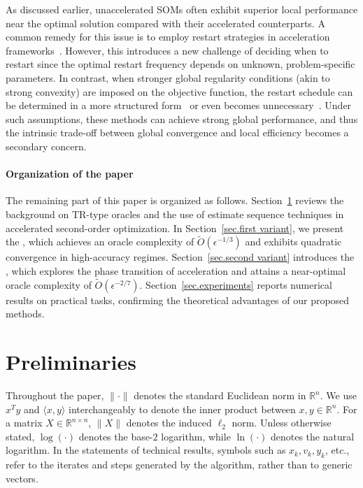 \documentclass{article}
\numberwithin{equation}{section}
\numberwithin{equation}{section}
\begin{document}
As discussed earlier, unaccelerated SOMs often exhibit superior local performance near the optimal solution compared with their accelerated counterparts. A common remedy for this issue is to employ restart strategies in acceleration frameworks~\cite{nesterov2018lectures}. However, this introduces a new challenge of deciding when to restart since the optimal restart frequency depends on unknown, problem-specific parameters. In contrast, when stronger global regularity conditions (akin to strong convexity) are imposed on the objective function, the restart schedule can be determined in a more structured form~\cite{ostroukhov2020tensor, lin2025perseus, huang2025approximation} or even becomes unnecessary~\cite{jiang2022generalized, marquesalves2022variants}. Under such assumptions, these methods can achieve strong global performance, and thus the intrinsic trade-off between global convergence and local efficiency becomes a secondary concern.

\paragraph{Organization of the paper}
The remaining part of this paper is organized as follows. Section~\ref{sec.priliminary} reviews the background on TR-type oracles and the use of estimate sequence techniques in accelerated second-order optimization. In Section~\ref{sec.first variant}, we present the , which achieves an oracle complexity of $\tilde O(\epsilon^{-1/3})$ and exhibits quadratic convergence in high-accuracy regimes. Section~\ref{sec.second variant} introduces the , which explores the phase transition of acceleration and attains a near-optimal oracle complexity of $\tilde O(\epsilon^{-2/7})$. Section~\ref{sec.experiments} reports numerical results on practical tasks, confirming the theoretical advantages of our proposed methods.


\section{Preliminaries}
\label{sec.priliminary}
Throughout the paper, $\|\cdot\|$ denotes the standard Euclidean norm in $\mathbb{R}^n$. We use $x^T y$ and $\langle x,y\rangle$ interchangeably to denote the inner product between $x,y\in\mathbb{R}^n$. For a matrix $X\in\mathbb{R}^{n\times n}$, $\|X\|$ denotes the induced $\ell_2$ norm. Unless otherwise stated, $\log(\cdot)$ denotes the base-$2$ logarithm, while $\ln(\cdot)$ denotes the natural logarithm. In the statements of technical results, symbols such as $x_k,v_k,y_k$, etc., refer to the iterates and steps generated by the algorithm, rather than to generic vectors.
\end{document}
